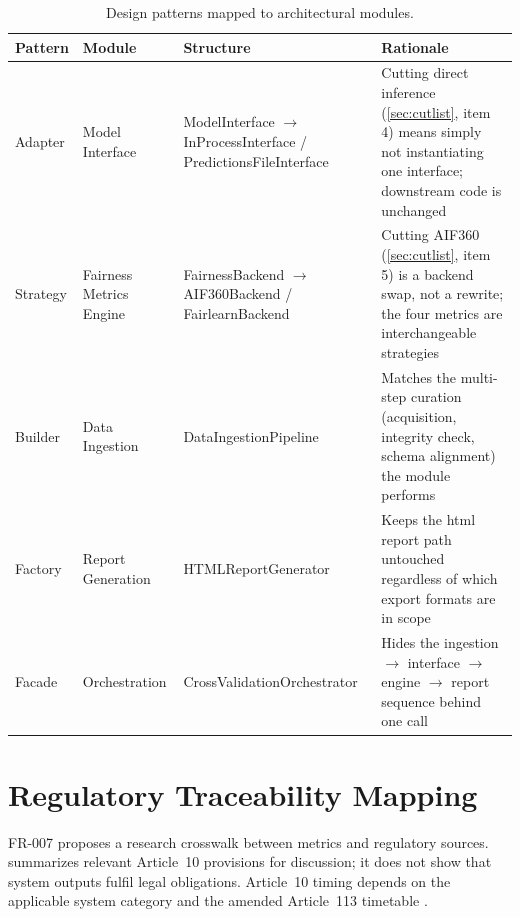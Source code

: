 \begin{table}[htbp]
    \centering
    \renewcommand{\arraystretch}{1.3}
    \caption{Design patterns mapped to architectural modules.}
    \label{tab:patterns}
    \begin{tabular}{p{2cm}p{2.6cm}p{4.1cm}p{5.5cm}}
        \toprule
        \textbf{Pattern} & \textbf{Module} & \textbf{Structure} & \textbf{Rationale} \\
        \midrule
        Adapter & Model Interface & {\ttfamily\footnotesize Model\-Interface} $\to$ {\ttfamily\scriptsize In\-Process\-Interface} / {\ttfamily\scriptsize Predictions\-File\-Interface} & Cutting direct inference (\cref{sec:cutlist}, item 4) means simply not instantiating one interface; downstream code is unchanged \\
        Strategy & Fairness Metrics Engine & {\ttfamily\footnotesize Fairness\-Backend} $\to$ {\ttfamily\footnotesize AIF360Backend} / {\ttfamily\footnotesize Fairlearn\-Backend} & Cutting AIF360 (\cref{sec:cutlist}, item 5) is a backend swap, not a rewrite; the four metrics are interchangeable strategies \\
        Builder & Data Ingestion & {\ttfamily\footnotesize Data\-Ingestion\-Pipeline} & Matches the multi-step curation (acquisition, integrity check, schema alignment) the module performs \\
        Factory & Report Generation & {\ttfamily\footnotesize HTMLReport\-Generator} & Keeps the \gls{html} report path untouched regardless of which export formats are in scope \\
        Facade & Orchestration & {\ttfamily\footnotesize Cross\-Validation\-Orchestrator} & Hides the ingestion $\to$ interface $\to$ engine $\to$ report sequence behind one call \\
        \bottomrule
    \end{tabular}
\end{table}

\section{Regulatory Traceability Mapping}
\label{sec:regmapping}

FR-007 proposes a research crosswalk between metrics and regulatory sources.  summarizes relevant Article~10 provisions for discussion; it does not show that system outputs fulfil legal obligations. Article~10 timing depends on the applicable system category and the amended Article~113 timetable \cite{buscemi2025assessing,euaiact2024,euomnibus2026}.

